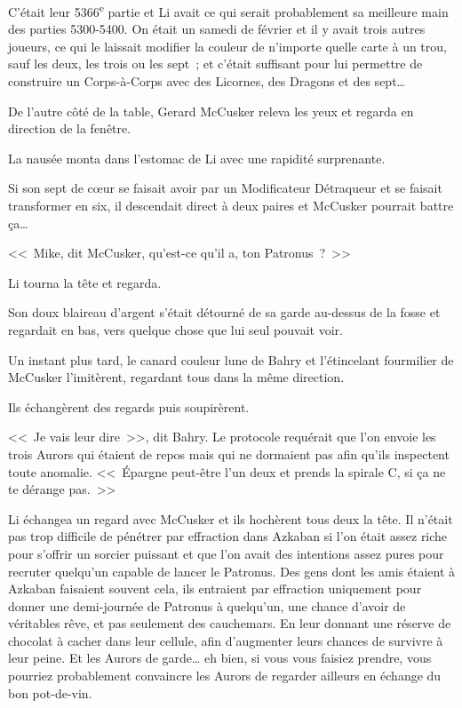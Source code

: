 C'était leur 5366\textsuperscript{e} partie et Li avait ce qui serait probablement sa meilleure main des parties 5300-5400. On était un samedi de février et il y avait trois autres joueurs, ce qui le laissait modifier la couleur de n'importe quelle carte à un trou, sauf les deux, les trois ou les sept~; et c'était suffisant pour lui permettre de construire un Corps-à-Corps avec des Licornes, des Dragons et des sept…

De l'autre côté de la table, Gerard McCusker releva les yeux et regarda en direction de la fenêtre.

La nausée monta dans l'estomac de Li avec une rapidité surprenante.

Si son sept de cœur se faisait avoir par un Modificateur Détraqueur et se faisait transformer en six, il descendait direct à deux paires et McCusker pourrait battre ça…

<<~Mike, dit McCusker, qu'est-ce qu'il a, ton Patronus~?~>>

Li tourna la tête et regarda.

Son doux blaireau d'argent s'était détourné de sa garde au-dessus de la fosse et regardait en bas, vers quelque chose que lui seul pouvait voir.

Un instant plus tard, le canard couleur lune de Bahry et l'étincelant fourmilier de McCusker l'imitèrent, regardant tous dans la même direction.

Ils échangèrent des regards puis soupirèrent.

<<~Je vais leur dire~>>, dit Bahry. Le protocole requérait que l'on envoie les trois Aurors qui étaient de repos mais qui ne dormaient pas afin qu'ils inspectent toute anomalie. <<~Épargne peut-être l'un deux et prends la spirale C, si ça ne te dérange pas.~>>

Li échangea un regard avec McCusker et ils hochèrent tous deux la tête. Il n'était pas trop difficile de pénétrer par effraction dans Azkaban si l'on était assez riche pour s'offrir un sorcier puissant et que l'on avait des intentions assez pures pour recruter quelqu'un capable de lancer le Patronus. Des gens dont les amis étaient à Azkaban faisaient souvent cela, ils entraient par effraction uniquement pour donner une demi-journée de Patronus à quelqu'un, une chance d'avoir de véritables rêve, et pas seulement des cauchemars. En leur donnant une réserve de chocolat à cacher dans leur cellule, afin d'augmenter leurs chances de survivre à leur peine. Et les Aurors de garde… eh bien, si vous vous faisiez prendre, vous pourriez probablement convaincre les Aurors de regarder ailleurs en échange du bon pot-de-vin.

